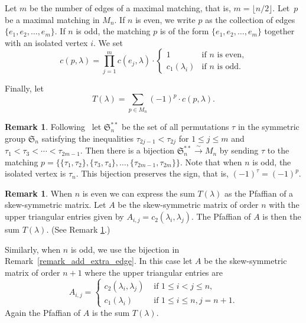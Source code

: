 \documentclass[10pt]{amsart}
\theoremstyle{definition}
\newtheorem{remark}[theorem]{Remark}
\newcommand{\Sym}{\mathfrak{S}}
\newcommand{\fl}{\rightarrow}
\newcommand{\iso}{\stackrel{\sim}{\fl}}
\begin{document}
Let $m$ be the number of edges of a maximal matching,
that is, $m = \lfloor n/2 \rfloor$.
Let~$p$ be a maximal matching in $M_{n}$.
If $n$ is even, we write $p$ as the collection of
edges~$\{e_{1}, e_{2}, \ldots, e_{m}\}$.
If $n$ is odd, the matching $p$
is of the form
$\{e_{1}, e_{2}, \ldots, e_{m}\}$
together with an isolated vertex $i$.
We set
$$
c(p,\lambda)=\prod_{j=1}^{m} c(e_{j},\lambda) 
\cdot
\begin{cases}
1 & \text{if $n$ is even,} \\
c_{1}(\lambda_{i}) & \text{if $n$ is odd.}
\end{cases}
$$



Finally, let
\begin{equation}
     T(\lambda)=\sum_{p\in M_{n}} (-1)^{p} \cdot c(p,\lambda) . 
\label{equation_T_lambda}
\end{equation}


\begin{remark}
{\rm
Following~\cite{Herb}
let $\Sym_{n}^{**}$
be the set of all permutations $\tau$
in the symmetric group $\Sym_{n}$
satisfying the inequalities
$\tau_{2j-1} < \tau_{2j}$ for
$1 \leq j \leq m$
and
$\tau_{1} < \tau_{3} < \cdots < \tau_{2m-1}$.
Then there is a bijection
$\Sym_{n}^{**} \iso M_{n}$
by sending $\tau$ to the matching
$p=\{\{\tau_{1},\tau_{2}\}, \{\tau_{3},\tau_{4}\},\ldots,
\{\tau_{2m-1},\tau_{2m}\}\}$.
Note that when $n$ is odd, the isolated vertex is $\tau_{n}$.
This bijection preserves the sign, that is,
$(-1)^{\tau} = (-1)^{p}$. 
}
\label{remark_Sn**}
\end{remark}


\begin{remark}
{\rm
When $n$ is even we can express the
sum $T(\lambda)$ as the Pfaffian of a skew-symmetric matrix.
Let $A$ be the skew-symmetric matrix of order $n$
with the upper triangular entries given by
$A_{i,j}=c_2(\lambda_{i},\lambda_{j})$.
The Pfaffian of $A$ is then the sum $T(\lambda)$. (See Remark \ref{remark_Sn**}.)

Similarly, when $n$ is odd, we use the bijection in
Remark~\ref{remark_add_extra_edge}.
In this case let $A$ be the skew-symmetric
matrix of order $n+1$ where
the upper triangular entries are 
$$ A_{i,j}
=
\begin{cases}
c_{2}(\lambda_{i},\lambda_{j})
& \text{ if } 1 \leq i < j \leq n , \\
c_{1}(\lambda_{i})
& \text{ if } 1 \leq i \leq n, j=n+1 .
\end{cases}
$$
Again the Pfaffian of $A$ is the sum $T(\lambda)$.
}
\end{remark}
\end{document}
